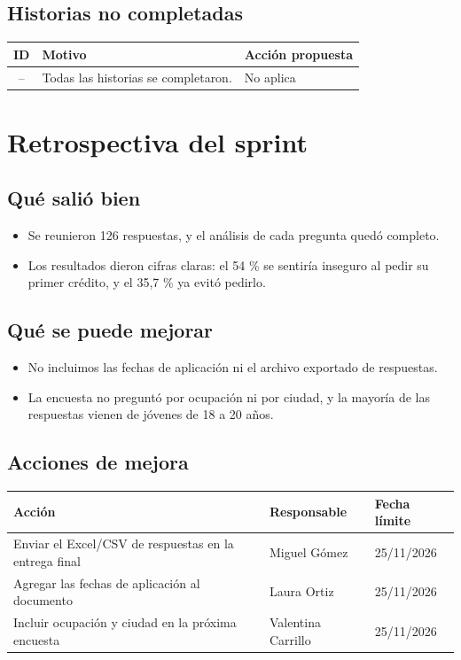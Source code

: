 \documentclass[11pt,a4paper]{article}
\begin{document}
\subsection{Historias no completadas}
\begin{tabularx}{\textwidth}{c X X}
  \toprule
  \textbf{ID} & \textbf{Motivo} & \textbf{Acción propuesta} \\
  \midrule
  -- & Todas las historias se completaron. & No aplica \\
  \bottomrule
\end{tabularx}

\section{Retrospectiva del sprint}

\subsection{Qué salió bien}
\begin{itemize}[leftmargin=1.5em]
  \item {Se reunieron 126 respuestas, y el análisis de cada pregunta quedó completo.}
  \item {Los resultados dieron cifras claras: el 54 \% se sentiría inseguro al pedir su primer crédito, y el 35,7 \% ya evitó pedirlo.}
\end{itemize}

\subsection{Qué se puede mejorar}
\begin{itemize}[leftmargin=1.5em]
  \item {No incluimos las fechas de aplicación ni el archivo exportado de respuestas.}
  \item {La encuesta no preguntó por ocupación ni por ciudad, y la mayoría de las respuestas vienen de jóvenes de 18 a 20 años.}
\end{itemize}

\subsection{Acciones de mejora}
\begin{tabularx}{\textwidth}{X l l}
  \toprule
  \textbf{Acción} & \textbf{Responsable} & \textbf{Fecha límite} \\
  \midrule
  Enviar el Excel/CSV de respuestas en la entrega final & Miguel Gómez & 25/11/2026 \\
  Agregar las fechas de aplicación al documento & Laura Ortiz & 25/11/2026 \\
  Incluir ocupación y ciudad en la próxima encuesta & Valentina Carrillo & 25/11/2026 \\
  \bottomrule
\end{tabularx}
\end{document}

